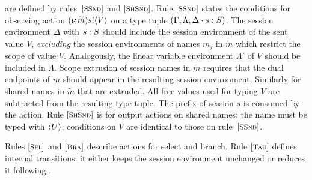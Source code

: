  are defined by rules~$\eltsrule{SSnd}$
and $\eltsrule{ShSnd}$.  
Rule $\eltsrule{SSnd}$ states the conditions for observing action
$(\nu\, \widetilde{m}) s ! \langle V \rangle$ on a type tuple 
$(\Gamma, \Lambda, \Delta\cdot s : S)$. 
The session environment $\Delta$ with $s : S$ 
should include the session environment of the sent value $V$, 
{\em excluding} the session environments of names $m_j$ 
in $\widetilde{m}$ which restrict the scope of value $V$. 
Analogously, the linear variable environment 
$\Lambda'$ of $V$ should be included in $\Lambda$. 
Scope extrusion of session names in $\widetilde{m}$ requires
that the dual endpoints of $\widetilde{m}$ should appear in
the resulting session environment. Similarly for shared 
names in $\widetilde{m}$ that are extruded.  
All free values used for typing $V$ are subtracted from the
resulting type tuple. The prefix of session $s$ is consumed
by the action.
Rule $\eltsrule{ShSnd}$ is for output actions on shared names:
the name must be typed with $\langle U \rangle$; conditions on $V$ are identical to those
on rule~$\eltsrule{SSnd}$.

Rules $\eltsrule{Sel}$ and $\eltsrule{Bra}$ describe actions for
select and branch.
Rule $\eltsrule{Tau}$ defines
internal transitions: 
it either keeps the session environment unchanged or 
reduces it following .


